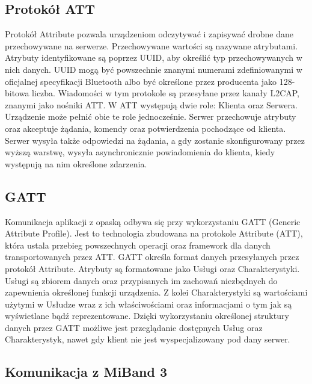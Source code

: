 \subsection{Protokół ATT}
Protokół Attribute pozwala urządzeniom odczytywać i zapisywać drobne dane przechowywane na serwerze.
Przechowywane wartości są nazywane atrybutami. Atrybuty identyfikowane są poprzez
UUID, aby określić typ przechowywanych w nich danych. UUID mogą być powszechnie znanymi
numerami zdefiniowanymi w oficjalnej specyfikacji Bluetooth albo być
określone przez producenta jako 128-bitowa liczba. Wiadomości w tym
protokole są przesyłane przez kanały L2CAP, znanymi jako nośniki ATT. W ATT
występują dwie role: Klienta oraz Serwera. Urządzenie może pełnić obie te role
jednocześnie. Serwer przechowuje atrybuty oraz akceptuje żądania, komendy
oraz potwierdzenia pochodzące od klienta. Serwer wysyła także odpowiedzi na
żądania, a gdy zostanie skonfigurowany przez wyższą warstwę, wysyła asynchronicznie powiadomienia
do klienta, kiedy występują na nim określone zdarzenia.
\subsection{GATT}
Komunikacja aplikacji z opaską odbywa się przy wykorzystaniu GATT (Generic Attribute Profile). Jest to technologia zbudowana na protokole Attribute (ATT), która
ustala przebieg powszechnych operacji oraz framework dla danych transportowanych przez ATT.
GATT określa format danych przesyłanych przez protokół Attribute. Atrybuty są
formatowane jako Usługi oraz Charakterystyki. Usługi są zbiorem danych oraz
przypisanych im zachowań niezbędnych do zapewnienia określonej funkcji urządzenia.
Z kolei Charakterystyki są wartościami użytymi w Usłudze wraz z ich właściwościami
oraz informacjami o tym jak są wyświetlane bądź reprezentowane. Dzięki
wykorzystaniu określonej struktury danych przez GATT możliwe jest przeglądanie
dostępnych Usług oraz Charakterystyk, nawet gdy klient nie jest wyspecjalizowany
pod dany serwer.
\subsection{Komunikacja z MiBand 3}
